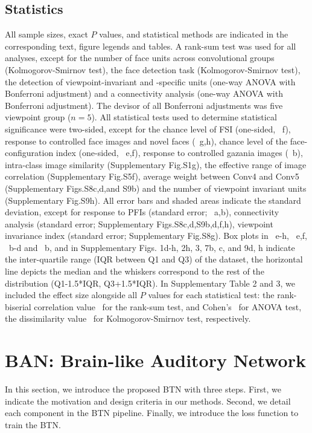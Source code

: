 \documentclass[final,3p,times,twocolumn]{elsarticle}
\begin{document}
\subsection{Statistics}
All sample sizes, exact $ P $ values, and statistical methods are indicated in the corresponding text, figure legends and tables.
A rank-sum test was used for all analyses, 
except for the number of face units across convolutional groups (Kolmogorov-Smirnov test),
the face detection task (Kolmogorov-Smirnov test),
the detection of viewpoint-invariant and -specific units (one-way ANOVA with Bonferroni adjustment)
and a connectivity analysis (one-way ANOVA with Bonferroni adjustment).
The devisor of all Bonferroni adjustments was five viewpoint group ($ n = 5 $).
All statistical tests used to determine statistical significance were two-sided, except for the chance level of FSI (one-sided, ~f),
response to controlled face images and novel faces (~g,h),
chance level of the face-configuration index (one-sided, ~e,f),
response to controlled gazania images (~b),
intra-class image similarity (Supplementary Fig.S1g),
the effective range of image correlation (Supplementary Fig.S5f),
average weight between Conv4 and Conv5 (Supplementary Figs.S8c,d,and S9b)
and the number of viewpoint invariant units (Supplementary Fig.S9h).
All error bars and shaded areas indicate the standard deviation, 
except for response to PFIs (standard error; ~a,b),
connectivity analysis (standard error; Supplementary Figs.S8c,d,S9b,d,f,h),
viewpoint invariance index (standard error; Supplementary Fig.S8g).
Box plots in ~e-h, ~e,f, ~b-d and ~b, and in Supplementary Figs. 1d-h, 2h, 3, 7b, c, and 9d, h indicate the inter-quartile range (IQR between Q1 and Q3) of the dataset, 
the horizontal line depicts the median and the whiskers correspond to the rest of the distribution (Q1-1.5*IQR, Q3+1.5*IQR).
In Supplementary Table 2 and 3, we included the effect size alongside all $ P $ values for each statistical test:
the rank-biserial correlation value~\cite{cureton1956rank} for the rank-sum test, 
and Cohen's~\cite{cohen2013statistical} for ANOVA test, the dissimilarity value~\cite{vermeesch2013multi} for Kolmogorov-Smirnov test, respectively.



\section{BAN: Brain-like Auditory Network} 
In this section, we introduce the proposed BTN with three steps. 
First, we indicate the motivation and design criteria in our methods.
Second, we detail each component in the BTN pipeline. 
Finally, we introduce the loss function to train the BTN. \par
\end{document}
